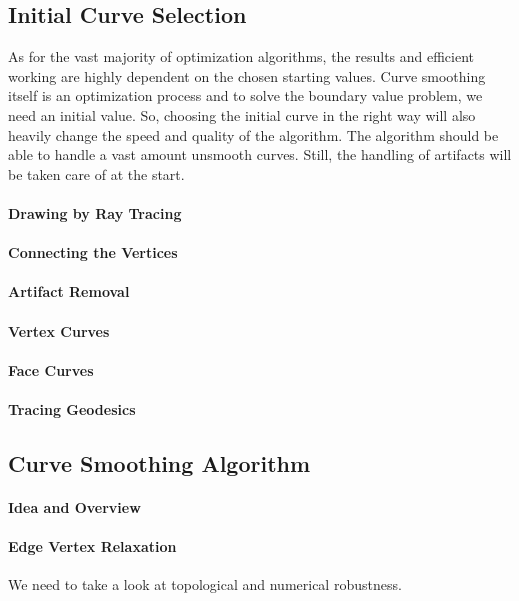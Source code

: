 \documentclass{stdlocal}
\begin{document}
\subsection{Initial Curve Selection} %
\label{sub:initial_curve_selection}
  As for the vast majority of optimization algorithms, the results and efficient working are highly dependent on the chosen starting values.
  Curve smoothing itself is an optimization process and to solve the boundary value problem, we need an initial value.
  So, choosing the initial curve in the right way will also heavily change the speed and quality of the algorithm.
  The algorithm should be able to handle a vast amount unsmooth curves.
  Still, the handling of artifacts will be taken care of at the start.
  \paragraph{Drawing by Ray Tracing}
  \paragraph{Connecting the Vertices}
  \paragraph{Artifact Removal}
  \paragraph{Vertex Curves}
  \paragraph{Face Curves}
  \paragraph{Tracing Geodesics}

\subsection{Curve Smoothing Algorithm} %
\label{sub:curve_smoothing_algorithm}
  \paragraph{Idea and Overview}
  \paragraph{Edge Vertex Relaxation}
    We need to take a look at topological and numerical robustness.
\end{document}
